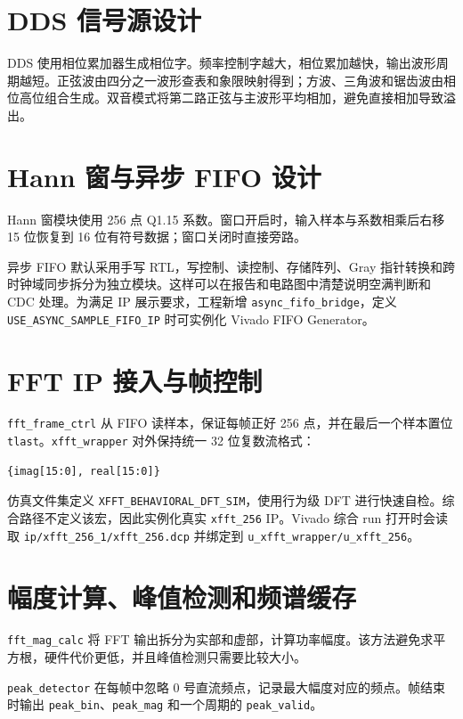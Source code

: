 \documentclass[UTF8,a4paper,12pt]{ctexart}
\begin{document}
\section{DDS 信号源设计}

DDS 使用相位累加器生成相位字。频率控制字越大，相位累加越快，输出波形周期越短。正弦波由四分之一波形查表和象限映射得到；方波、三角波和锯齿波由相位高位组合生成。双音模式将第二路正弦与主波形平均相加，避免直接相加导致溢出。

\section{Hann 窗与异步 FIFO 设计}

Hann 窗模块使用 256 点 Q1.15 系数。窗口开启时，输入样本与系数相乘后右移 15 位恢复到 16 位有符号数据；窗口关闭时直接旁路。

异步 FIFO 默认采用手写 RTL，写控制、读控制、存储阵列、Gray 指针转换和跨时钟域同步拆分为独立模块。这样可以在报告和电路图中清楚说明空满判断和 CDC 处理。为满足 IP 展示要求，工程新增 \texttt{async\_fifo\_bridge}，定义 \texttt{USE\_ASYNC\_SAMPLE\_FIFO\_IP} 时可实例化 Vivado FIFO Generator。

\section{FFT IP 接入与帧控制}

\texttt{fft\_frame\_ctrl} 从 FIFO 读样本，保证每帧正好 256 点，并在最后一个样本置位 \texttt{tlast}。\texttt{xfft\_wrapper} 对外保持统一 32 位复数流格式：

\begin{verbatim}
{imag[15:0], real[15:0]}
\end{verbatim}

仿真文件集定义 \texttt{XFFT\_BEHAVIORAL\_DFT\_SIM}，使用行为级 DFT 进行快速自检。综合路径不定义该宏，因此实例化真实 \texttt{xfft\_256} IP。Vivado 综合 run 打开时会读取 \texttt{ip/xfft\_256\_1/xfft\_256.dcp} 并绑定到 \texttt{u\_xfft\_wrapper/u\_xfft\_256}。

\section{幅度计算、峰值检测和频谱缓存}

\texttt{fft\_mag\_calc} 将 FFT 输出拆分为实部和虚部，计算功率幅度。该方法避免求平方根，硬件代价更低，并且峰值检测只需要比较大小。

\texttt{peak\_detector} 在每帧中忽略 0 号直流频点，记录最大幅度对应的频点。帧结束时输出 \texttt{peak\_bin}、\texttt{peak\_mag} 和一个周期的 \texttt{peak\_valid}。
\end{document}
